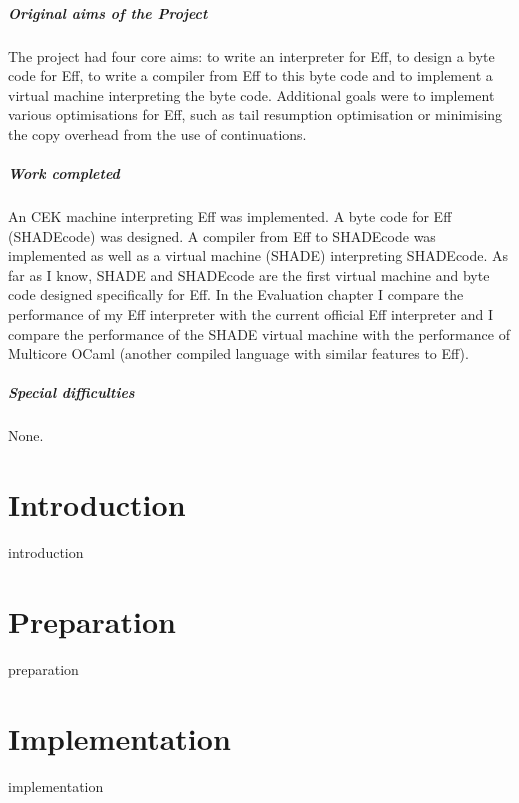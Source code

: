 \documentclass[%
    12pt,
    a4paper,
    bibliography=toc,
    listof=leveldown,%
    oneside
]{book}
\begin{document}
\paragraph{Original aims of the Project}

The project had four core aims: to write an interpreter for Eff, to design a byte code for Eff, to write a compiler from Eff to this byte code
and to implement a virtual machine interpreting the byte code. Additional goals were to implement various optimisations for Eff, such as
tail resumption optimisation or minimising the copy overhead from the use of continuations.

\paragraph{Work completed}

An CEK machine interpreting Eff was implemented. A byte code for Eff (SHADEcode) was designed. A compiler from Eff to SHADEcode was
implemented as well as a virtual machine (SHADE) interpreting SHADEcode. As far as I know, SHADE and SHADEcode are the first
virtual machine and byte code designed specifically for Eff.
In the Evaluation chapter
I compare the performance of my Eff interpreter with the current official Eff interpreter and I compare the performance of the SHADE
virtual machine with the performance of Multicore OCaml (another compiled language with similar features to Eff).

\paragraph{Special difficulties}
None.

\tableofcontents

\newpage
\listoffigures
\listoftables
\lstlistoflistings

\mainmatter

\chapter{Introduction}
{introduction}

\chapter{Preparation}
{preparation}

\chapter{Implementation}
{implementation}
\end{document}

